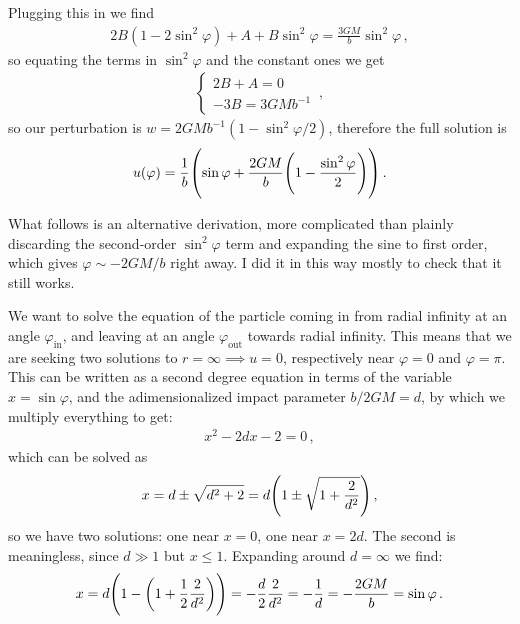 \documentclass[main.tex]{subfiles}
\begin{document}
Plugging this in we find 
%
\begin{align}
  2 B (1 - 2 \sin^2 \varphi) + A + B \sin^2 \varphi = \frac{3GM}{b} \sin^2 \varphi 
\,,
\end{align}
%
so equating the terms in \(\sin^2\varphi  \) and the constant ones we get 
%
\begin{align}
  \begin{cases}
    2B+A = 0 \\
    -3B = 3GMb^{-1}
  \end{cases}
\,,
\end{align}
%
so our perturbation is \(w = 2 GM b^{-1} (1- \sin^2 \varphi / 2)\), therefore the full solution is 
%
\begin{align}
  u(\varphi ) = \frac{1}{b} \qty(\sin \varphi + \frac{2GM}{b} \qty(1 - \frac{\sin^2 \varphi }{2}))
\,.
\end{align}
%

What follows is an alternative derivation, more complicated than plainly discarding the second-order \(\sin^2  \varphi  \) term and expanding the sine to first order, which gives \(\varphi \sim -2GM/b\) right away. I did it in this way mostly to check that it still works. 

We want to solve the equation of the particle coming in from radial infinity at an angle \(\varphi _{\text{in}}\), and leaving at an angle \(\varphi _{\text{out}}\) towards radial infinity. This means that we are seeking two solutions to \(r = \infty \implies u = 0\), respectively near \(\varphi = 0\) and \(\varphi = \pi \). This can be written as a second degree equation in terms of the variable \(x = \sin \varphi \), and the adimensionalized impact parameter \(b/ 2GM = d\), by which we multiply everything to get:  
%
\begin{align}
  x^2 - 2dx - 2 = 0
\,,
\end{align}
%
which can be solved as 
%
\begin{align}
  x =d \pm \sqrt{d^2 + 2}
  = d \qty(1 \pm \sqrt{1 + \frac{2}{d^2}})
\,,
\end{align}
%
so we have two solutions: one near \(x=0\), one near \(x=2d\). The second is meaningless, since \(d \gg 1 \) but \(x \leq 1\). Expanding around \(d = \infty\) we find: 
%
\begin{align}
  x = d \qty(1 - \qty(1 + \frac{1}{2} \frac{2}{d^2})) = -\frac{d}{2}  \frac{2}{d^2} = -\frac{1}{d} = - \frac{2GM}{b} = \sin \varphi 
\,. 
\end{align}
%
\end{document}

